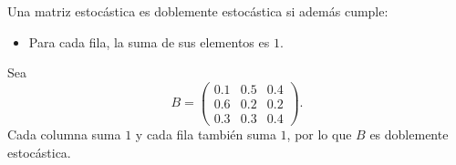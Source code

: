 \documentclass[a4paper,12pt]{article}
\begin{document}
\begin{procedimiento}[title=Matriz doblemente estocástica]
Una matriz estocástica es doblemente estocástica si además cumple:
\begin{itemize}
    \item Para cada fila, la suma de sus elementos es $1$.
\end{itemize}
\end{procedimiento}

\begin{ejemplo}[title=Ejemplo de matriz doblemente estocástica]
Sea
\[
B=
\begin{pmatrix}
0\text{.}1 & 0\text{.}5 & 0\text{.}4 \\
0\text{.}6 & 0\text{.}2 & 0\text{.}2 \\
0\text{.}3 & 0\text{.}3 & 0\text{.}4
\end{pmatrix}.
\]
Cada columna suma $1$ y cada fila también suma $1$, por lo que $B$ es doblemente estocástica.
\end{ejemplo}
\end{document}
